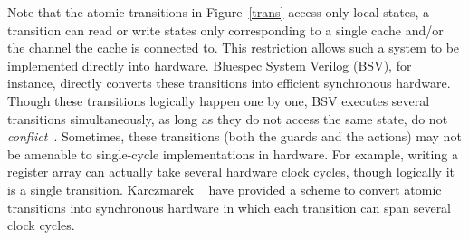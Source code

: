 Note that the atomic transitions in Figure~\ref{trans} access only local states,
\ie{} a transition can read or write states only corresponding to a single cache
and/or the channel the cache is connected to. This restriction allows such a
system to be implemented directly into hardware. Bluespec System Verilog (BSV),
for instance, directly converts these transitions into efficient synchronous
hardware. Though these transitions logically happen one by one, BSV executes
several transitions simultaneously, as long as they do not access the same
state, \ie{} do not \emph{conflict}~\cite{Hoe:TCAD,HoeArvind:TRSSynthesis1}.
Sometimes, these transitions (both the guards and the actions) may not be
amenable to single-cycle implementations in hardware. For example, writing a
register array can actually take several hardware clock cycles, though
logically it is a single transition. Karczmarek \etal~\cite{Karczmarek} have
provided a scheme to convert atomic transitions into synchronous hardware in
which each transition can span several clock cycles.
